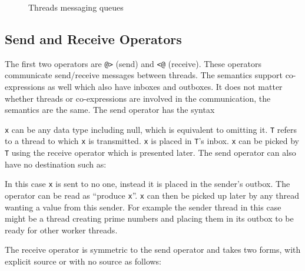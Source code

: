 \begin{figure}[h]
\begin{center}
\end{center}
\caption{\label{msg-queues}Threads messaging queues}
\end{figure}

\subsection{Send and Receive Operators}
The first two operators are \texttt{@>} (send) and \texttt{<@}
(receive). These operators communicate send/receive messages between
threads. The semantics support co-expressions as well which also have
inboxes and outboxes. It does not matter whether threads or co-expressions
are involved in the communication, the semantics are the same. The send
operator has the syntax


\noindent
\texttt{x} can be any data type including null, which is equivalent to
omitting it. \texttt{T} refers to a thread to which \texttt{x} is
transmitted. \texttt{x} is placed in \texttt{T}'s inbox. \texttt{x} can be
picked by \texttt{T} using the receive operator which is presented
later. The send operator can also have no destination such as:


\noindent
In this case \texttt{x} is sent to no one, instead it is placed in the
sender's outbox.  The operator can be read as ``produce \texttt{x}''.
\texttt{x} can then be picked up later by any thread wanting a value from
this sender. For example the sender thread in this case might be a thread
creating prime numbers and placing them in its outbox to be ready for other
worker threads.

The receive operator is symmetric to the send operator and takes two forms, with
explicit source or with no source as follows:


